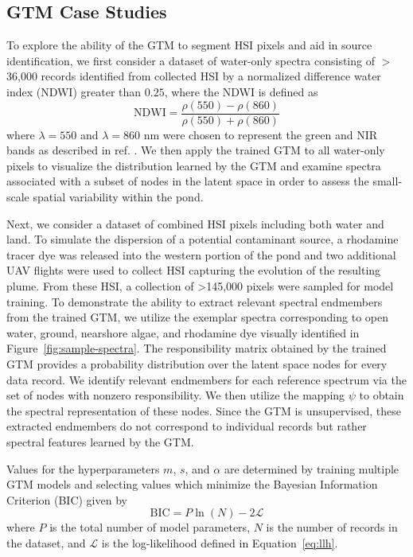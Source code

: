 \subsection{GTM Case Studies}\label{sec:case-studies}

To explore the ability of the GTM to segment HSI pixels and aid in source identification, we first consider a dataset of water-only spectra consisting of $>$36,000 records identified from collected HSI by a normalized difference water index (NDWI) greater than $0.25$, where the NDWI is defined as
\begin{equation}
    \text{NDWI} = \dfrac{\rho(550) - \rho(860)}{\rho(550) + \rho(860)}
\end{equation}
where $\lambda=550$ and $\lambda=860$ nm were chosen to represent the green and NIR bands as described in ref. \cite{ndwi}. We then apply the trained GTM to all water-only pixels to visualize the distribution learned by the GTM and examine spectra associated with a subset of nodes in the latent space in order to assess the small-scale spatial variability within the pond.

Next, we consider a dataset of combined HSI pixels including both water and land. To simulate the dispersion of a potential contaminant source, a rhodamine tracer dye was released into the western portion of the pond and two additional UAV flights were used to collect HSI capturing the evolution of the resulting plume. From these HSI, a collection of >145,000 pixels were sampled for model training. To demonstrate the ability to extract relevant spectral endmembers from the trained GTM, we utilize the exemplar spectra corresponding to open water, ground, nearshore algae, and rhodamine dye visually identified in Figure~\ref{fig:sample-spectra}. The responsibility matrix obtained by the trained GTM provides a probability distribution over the latent space nodes for every data record. We identify relevant endmembers for each reference spectrum via the set of nodes with nonzero responsibility. We then utilize the mapping $\psi$ to obtain the spectral representation of these nodes. Since the GTM is unsupervised, these extracted endmembers do not correspond to individual records but rather spectral features learned by the GTM. 

Values for the hyperparameters $m$, $s$, and $\alpha$ are determined by training multiple GTM models and selecting values which minimize the Bayesian Information Criterion (BIC) given by 
\begin{equation}
    \text{BIC} = P\ln(N) - 2\mathcal{L}
\end{equation}
where $P$ is the total number of model parameters, $N$ is the number of records in the dataset, and $\mathcal{L}$ is the log-likelihood defined in Equation~\eqref{eq:llh}.

